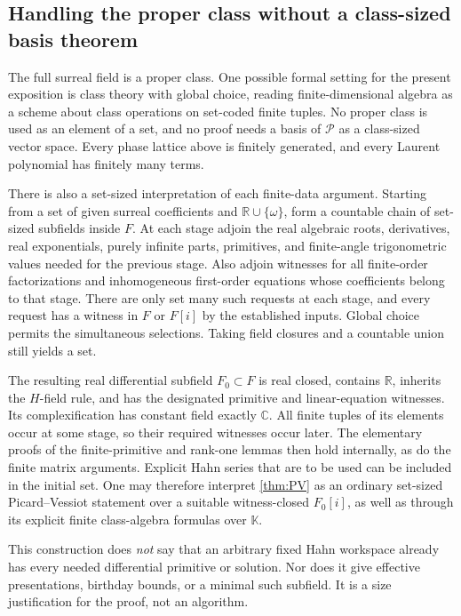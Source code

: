 \documentclass[11pt,a4paper]{article}
\numberwithin{equation}{section}
\theoremstyle{definition}
\theoremstyle{remark}
\newcommand{\K}{\mathbb K}
\newcommand{\R}{\mathbb R}
\newcommand{\C}{\mathbb C}
\newcommand{\PP}{\mathcal P}
\begin{document}
\subsection{Handling the proper class without a class-sized basis theorem}
The full surreal field is a proper class. One possible formal setting
for the present exposition is class theory with global choice, reading
finite-dimensional algebra as a scheme about class operations on
set-coded finite tuples. No proper class is used as an element of a set,
and no proof needs a basis of $\PP$ as a class-sized vector space.
Every phase lattice above is finitely generated, and every Laurent
polynomial has finitely many terms.

There is also a set-sized interpretation of each finite-data argument.
Starting from a set of given surreal coefficients and $\R\cup\{\omega\}$,
form a countable chain of set-sized subfields inside $F$. At each stage
adjoin the real algebraic roots, derivatives, real exponentials, purely
infinite parts, primitives, and finite-angle trigonometric values needed
for the previous stage. Also adjoin witnesses for all finite-order
factorizations and inhomogeneous first-order equations whose coefficients
belong to that stage. There are only set many such requests at each
stage, and every request has a witness in $F$ or $F[i]$ by the established
inputs. Global choice permits the simultaneous selections. Taking field
closures and a countable union still yields a set.

The resulting real differential subfield $F_0\subset F$ is real closed,
contains $\R$, inherits the $H$-field rule, and has the designated
primitive and linear-equation witnesses. Its complexification has
constant field exactly $\C$. All finite tuples of its elements occur
at some stage, so their required witnesses occur later. The elementary
proofs of the finite-primitive and rank-one lemmas then hold internally,
as do the finite matrix arguments. Explicit Hahn series that are to be
used can be included in the initial set. One may therefore interpret
\cref{thm:PV} as an ordinary set-sized Picard--Vessiot statement over a
suitable witness-closed $F_0[i]$, as well as through its explicit finite
class-algebra formulas over $\K$.

This construction does \emph{not} say that an arbitrary fixed Hahn
workspace already has every needed differential primitive or solution.
Nor does it give effective presentations, birthday bounds, or a minimal
such subfield. It is a size justification for the proof, not an algorithm.
\end{document}
